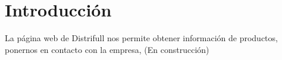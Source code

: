 \chapter*{Introducci\'on}
La p\'agina web de Distrifull nos permite obtener informaci\'on de productos, ponernos en contacto con la empresa, (En construcci\'on)

